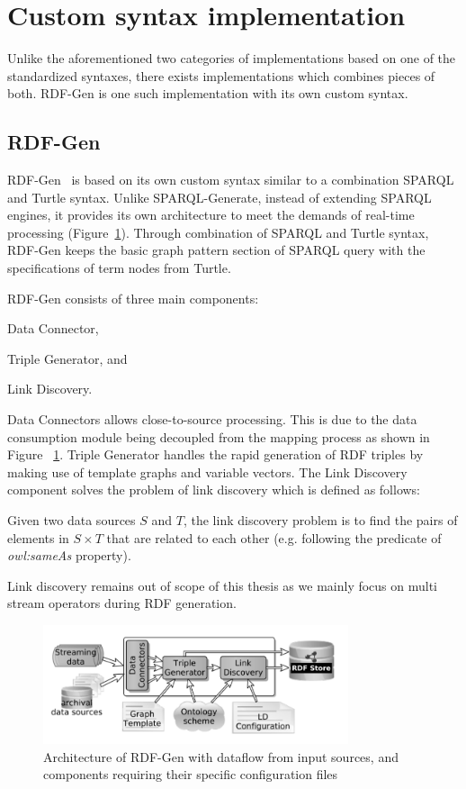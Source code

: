 \section{Custom syntax implementation}
Unlike the aforementioned two categories of implementations based on one of the
standardized syntaxes, 
there exists implementations which combines pieces of both. RDF-Gen is one such 
implementation with its own custom syntax. 

\subsection{RDF-Gen}
RDF-Gen~\cite{rdf_gen} is based on its own custom syntax 
similar to a combination SPARQL and Turtle syntax. 
Unlike SPARQL-Generate, instead of extending SPARQL engines, 
it provides its own architecture to meet the demands
of real-time processing (Figure~\ref{fig:rdf-gen-arch}). 
Through combination of SPARQL and Turtle syntax, RDF-Gen 
keeps the basic graph pattern section of SPARQL query with 
the specifications of term nodes from Turtle.

RDF-Gen consists of three main components: 
\begin{enumerate*}[label=(\alph*)]
  \item Data Connector,
  \item Triple Generator, and
  \item Link Discovery.
\end{enumerate*}

Data Connectors allows close-to-source processing. This is due to the
data consumption 
module being decoupled from the mapping process as shown in Figure ~\ref{fig:rdf-gen-arch}. 
Triple Generator handles the rapid generation of RDF triples by making use of 
template graphs and variable vectors. The Link Discovery component solves the 
problem of link discovery which is defined as follows:

\begin{defn}    
Given two data sources $S$ and $T$, the link discovery problem is to
find the pairs of elements in 
$S \times T$ that are related to each other (e.g. following the predicate of 
\emph{owl:sameAs} property). 
\end{defn}

Link discovery remains out of scope of this thesis as we mainly focus on 
multi stream operators during RDF generation.

\begin{figure}[!htbp]
  \centering
  \includegraphics[width=0.8\textwidth]{fig/rdf-gen-arch.png}
  \caption{Architecture of RDF-Gen with dataflow from input sources, and 
  components requiring their specific configuration files~\cite{rdf_gen}}
  \label{fig:rdf-gen-arch}
\end{figure}

